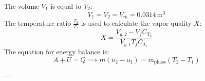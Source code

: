 The volume \( V_1 \) is equal to \( V_2 \):  
\[
V_1 = V_2 = V_m = 0.0314 \, \text{m}^3
\]  
The temperature ratio \( \frac{T_2}{T_1} \) is used to calculate the vapor quality \( X \):  
\[
X = \frac{V_{g,2} - V_{f} C_{T_2}}{V_{g,1} T_{f} C_{T_2}}
\]  
The equation for energy balance is:  
\[
A + U = Q \implies m (u_2 - u_1) = m_{\text{phase}} (T_2 - T_1)
\]  

---
